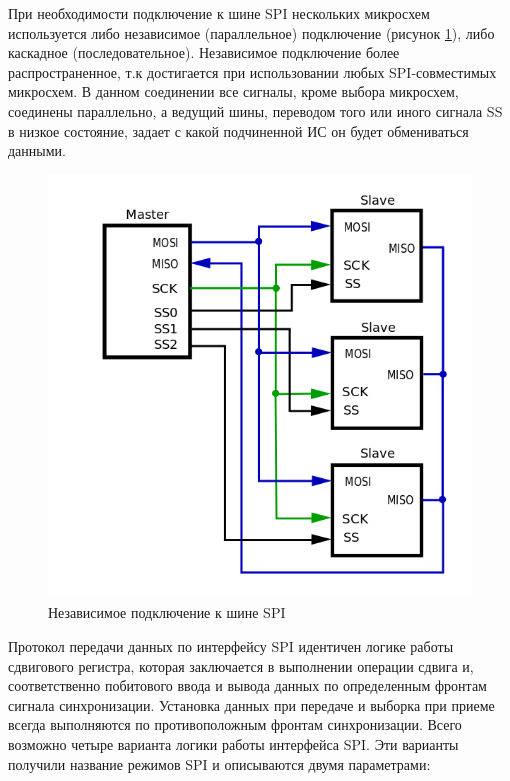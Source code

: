 При необходимости подключение к шине SPI нескольких микросхем используется либо независимое (параллельное) подключение (рисунок \ref{fig:spiindep}), либо каскадное (последовательное). Независимое подключение более распространенное, т.к достигается при использовании любых SPI-совместимых микросхем. В данном соединении все сигналы, кроме выбора микросхем, соединены параллельно, а ведущий шины, переводом того или иного сигнала SS в низкое состояние, задает с какой подчиненной ИС он будет обмениваться данными.

\begin{figure}[H]
	\centering
		\includegraphics[scale=0.5]{img/spiindependent.png}
	\caption{Независимое подключение к шине SPI \label{fig:spiindep}}
\end{figure}


Протокол передачи данных по интерфейсу SPI идентичен логике работы сдвигового регистра, которая заключается в выполнении операции сдвига и, соответственно побитового ввода и вывода данных по определенным фронтам сигнала синхронизации. Установка данных при передаче и выборка при приеме всегда выполняются по противоположным фронтам синхронизации. Всего возможно четыре варианта логики работы интерфейса SPI. Эти варианты получили название режимов SPI и описываются двумя параметрами:


